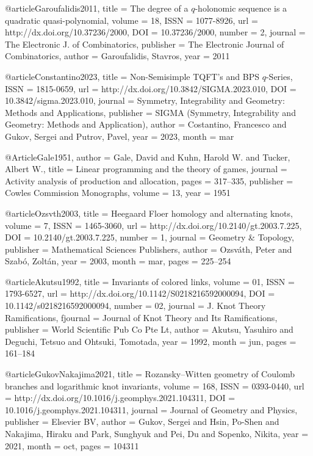 @article{Garoufalidis2011,
  title = {The degree of a $q$-holonomic sequence is a quadratic quasi-polynomial},
  volume = 18,
  ISSN = {1077-8926},
  url = {http://dx.doi.org/10.37236/2000},
  DOI = {10.37236/2000},
  number = 2,
  journal = {The Electronic J. of Combinatorics},
  publisher = {The Electronic Journal of Combinatorics},
  author = {Garoufalidis,  Stavros},
  year = 2011
}

@article{Constantino2023,
  title = {Non-Semisimple {TQFT’s} and {BPS} $q$-Series},
  ISSN = {1815-0659},
  url = {http://dx.doi.org/10.3842/SIGMA.2023.010},
  DOI = {10.3842/sigma.2023.010},
  journal = {Symmetry,  Integrability and Geometry: Methods and Applications},
  publisher = {SIGMA (Symmetry,  Integrability and Geometry: Methods and Application)},
  author = {Costantino,  Francesco and Gukov,  Sergei and Putrov,  Pavel},
  year = {2023},
  month = mar 
}

@Article{Gale1951,
  author = {Gale, David and Kuhn, Harold W. and Tucker, Albert W.},
  title = {Linear programming and the theory of games},
  journal = {Activity analysis of production and allocation},
  pages = {317--335},
  publisher = {Cowles Commission Monographs},
  volume = {13},
  year = {1951}
}

@article{Ozsvth2003,
  title = {Heegaard {Floer} homology and alternating knots},
  volume = {7},
  ISSN = {1465-3060},
  url = {http://dx.doi.org/10.2140/gt.2003.7.225},
  DOI = {10.2140/gt.2003.7.225},
  number = {1},
  journal = {Geometry \& Topology},
  publisher = {Mathematical Sciences Publishers},
  author = {Ozsváth,  Peter and Szabó,  Zoltán},
  year = {2003},
  month = mar,
  pages = {225--254}
}

@article{Akutsu1992,
  title = {Invariants of colored links},
  volume = {01},
  ISSN = {1793-6527},
  url = {http://dx.doi.org/10.1142/S0218216592000094},
  DOI = {10.1142/s0218216592000094},
  number = {02},
  journal = {J. Knot Theory Ramifications},
  fjournal = {Journal of Knot Theory and Its Ramifications},
  publisher = {World Scientific Pub Co Pte Lt},
  author = {Akutsu, Yasuhiro and Deguchi, Tetsuo and Ohtsuki, Tomotada},
  year = {1992},
  month = jun,
  pages = {161--184}
}

@article{GukovNakajima2021,
  title = {Rozansky--Witten geometry of {Coulomb} branches and logarithmic knot invariants},
  volume = {168},
  ISSN = {0393-0440},
  url = {http://dx.doi.org/10.1016/j.geomphys.2021.104311},
  DOI = {10.1016/j.geomphys.2021.104311},
  journal = {Journal of Geometry and Physics},
  publisher = {Elsevier BV},
  author = {Gukov,  Sergei and Hsin,  Po-Shen and Nakajima,  Hiraku and Park,  Sunghyuk and Pei,  Du and Sopenko,  Nikita},
  year = {2021},
  month = oct,
  pages = {104311}
}

